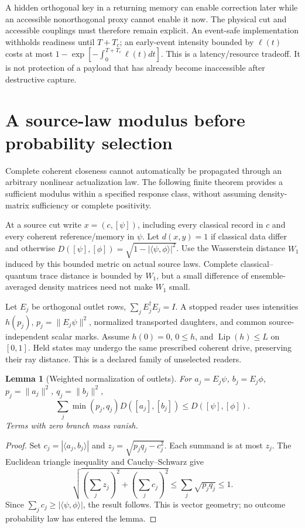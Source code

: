 \documentclass[11pt,oneside,openany]{book}
\newtheorem{lemma}[theorem]{Lemma}
\theoremstyle{definition}
\theoremstyle{remark}\newtheorem{remark}[theorem]{Remark}
\begin{document}
A hidden orthogonal key in a returning memory can enable correction later while an accessible nonorthogonal proxy cannot enable it now. The physical cut and accessible couplings must therefore remain explicit. An event-safe implementation withholds readiness until $T+T_c$; an early-event intensity bounded by $\ell(t)$ costs at most $1-\exp[-\int_0^{T+T_c}\ell(t)dt]$. This is a latency/resource tradeoff. It is not protection of a payload that has already become inaccessible after destructive capture.

\section{A source-law modulus before probability selection}

Complete coherent closeness cannot automatically be propagated through an arbitrary nonlinear actualization law. The following finite theorem provides a sufficient modulus within a specified response class, without assuming density-matrix sufficiency or complete positivity.

At a source cut write $x=(c,[\psi])$, including every classical record in $c$ and every coherent reference/memory in $\psi$. Let $d(x,y)=1$ if classical data differ and otherwise
$D([\psi],[\phi])=\sqrt{1-|\langle\psi,\phi\rangle|^2}$. Use the Wasserstein distance $W_1$ induced by this bounded metric on actual source laws. Complete classical--quantum trace distance is bounded by $W_1$, but a small difference of ensemble-averaged density matrices need not make $W_1$ small.

Let $E_j$ be orthogonal outlet rows, $\sum_jE_j^\dagger E_j=I$. A stopped reader uses intensities $h(p_j)$, $p_j=\|E_j\psi\|^2$, normalized transported daughters, and common source-independent scalar marks. Assume $h(0)=0$, $0\le h$, and $\operatorname{Lip}(h)\le L$ on $[0,1]$. Held states may undergo the same prescribed coherent drive, preserving their ray distance. This is a declared family of unselected readers.

\begin{lemma}[Weighted normalization of outlets]
\label{prot:weighted}
For $a_j=E_j\psi$, $b_j=E_j\phi$, $p_j=\|a_j\|^2$, $q_j=\|b_j\|^2$,
\begin{equation}
 \sum_j\min(p_j,q_j)D([a_j],[b_j])\le D([\psi],[\phi]).
 \label{prot:weightedineq}
\end{equation}
Terms with zero branch mass vanish.
\end{lemma}
\begin{proof}
Set $c_j=|\langle a_j,b_j\rangle|$ and $z_j=\sqrt{p_jq_j-c_j^2}$. Each summand is at most $z_j$. The Euclidean triangle inequality and Cauchy--Schwarz give
\[
 \sqrt{(\sum_jz_j)^2+(\sum_jc_j)^2}
 \le\sum_j\sqrt{p_jq_j}\le1.
\]
Since $\sum_jc_j\ge|\langle\psi,\phi\rangle|$, the result follows. This is vector geometry; no outcome probability law has entered the lemma.
\end{proof}
\end{document}
